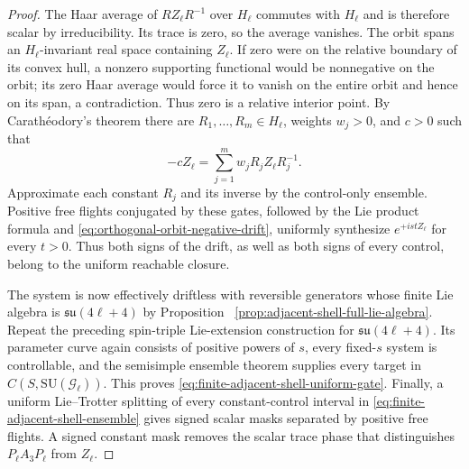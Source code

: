 \documentclass[11pt]{article}
\theoremstyle{remark}
\begin{document}
\begin{proof}
The Haar average of $RZ_\ell R^{-1}$ over $H_\ell$ commutes with
$H_\ell$ and is therefore scalar by irreducibility.  Its trace is zero, so
the average vanishes.  The orbit spans an $H_\ell$-invariant real space
containing $Z_\ell$.  If zero were on the relative boundary of its convex
hull, a nonzero supporting functional would be nonnegative on the orbit;
its zero Haar average would force it to vanish on the entire orbit and hence
on its span, a contradiction.  Thus zero is a relative interior point.
By Carath\'eodory's theorem there are
$R_1,\ldots,R_m\in H_\ell$, weights $w_j>0$, and $c>0$ such that
\begin{equation}
 -cZ_\ell=\sum_{j=1}^m w_jR_jZ_\ell R_j^{-1}.
 \label{eq:orthogonal-orbit-negative-drift}
\end{equation}
Approximate each constant $R_j$ and its inverse by the control-only
ensemble.  Positive free flights conjugated by these gates, followed by
the Lie product formula and \eqref{eq:orthogonal-orbit-negative-drift},
uniformly synthesize $e^{+istZ_\ell}$ for every $t>0$.  Thus both signs of
the drift, as well as both signs of every control, belong to the uniform
reachable closure.

The system is now effectively driftless with reversible generators whose
finite Lie algebra is
$\mathfrak{su}(4\ell+4)$ by Proposition
~\ref{prop:adjacent-shell-full-lie-algebra}.  Repeat the preceding
spin-triple Lie-extension construction for
$\mathfrak{su}(4\ell+4)$.  Its parameter curve again consists of positive
powers of $s$, every fixed-$s$ system is controllable, and the semisimple
ensemble theorem supplies every target in
$C(S,\mathrm{SU}(\mathcal G_\ell))$.  This proves
\eqref{eq:finite-adjacent-shell-uniform-gate}.
Finally, a uniform Lie--Trotter splitting of every constant-control
interval in \eqref{eq:finite-adjacent-shell-ensemble} gives signed scalar
masks separated by positive free flights.  A signed constant mask removes
the scalar trace phase that distinguishes $P_\ell A_3P_\ell$ from $Z_\ell$.
\end{proof}
\end{document}
